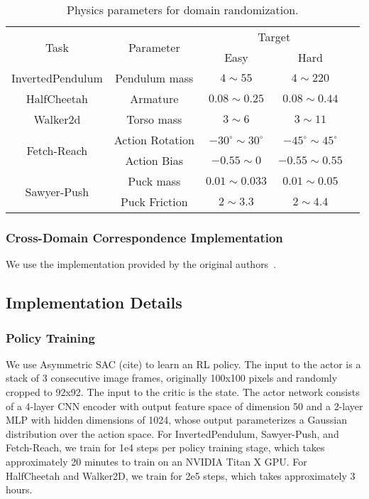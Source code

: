 \begin{table}[ht]
\centering
\caption{Physics parameters for domain randomization.}
\begin{tabular}{ ccccc } 
 \toprule
 \multirow{2}{7.5em}{\centering Task} & \multirow{2}{6.5em}{\centering Parameter} & \multicolumn{2}{c}{Target} \\ 
 & & Easy & Hard \\
 \midrule
 InvertedPendulum & Pendulum mass & $4 \sim 55$ & $4 \sim 220$ \\ 
 \midrule
 HalfCheetah & Armature & $0.08 \sim 0.25$ & $0.08 \sim 0.44$ \\ 
 \midrule
 Walker2d & Torso mass & $3 \sim 6$ & $3 \sim 11$ \\ 
 \midrule
 \multirow{2}{7.5em}{\centering Fetch-Reach} & Action Rotation & $-30^{\circ}\sim30^{\circ}$ & $-45^{\circ}\sim45^{\circ}$\\
 & Action Bias & $-0.55 \sim 0$ & $-0.55 \sim 0.55$ \\
 \midrule
\multirow{2}{7.5em}{\centering Sawyer-Push} & Puck mass & $0.01 \sim 0.033$ & $0.01 \sim 0.05$ \\ 
& Puck Friction & $ 2 \sim 3.3$ & $2 \sim 4.4$\\
 \bottomrule
\end{tabular}
\label{tab:dr_dynamics}
\end{table}


\subsubsection{Cross-Domain Correspondence Implementation}
\label{sec:cc_implementation}
We use the implementation provided by the original authors~\citep{zhang2021learning}.



\subsection{Implementation Details}

\subsubsection{\textbf{Policy Training}}
We use Asymmetric SAC (cite) to learn an RL policy.  The input to the actor is a stack of 3 consecutive image frames, originally 100x100 pixels and randomly cropped to 92x92.  The input to the critic is the state.  The actor network consists of a 4-layer CNN encoder with output feature space of dimension 50 and a 2-layer MLP with hidden dimensions of 1024, whose output parameterizes a Gaussian distribution over the action space.  For InvertedPendulum, Sawyer-Push, and Fetch-Reach, we train for 1e4 steps per policy training stage, which takes approximately 20 minutes to train on an  NVIDIA Titan X GPU. For HalfCheetah and Walker2D, we train for 2e5 steps, which takes approximately 3 hours.

